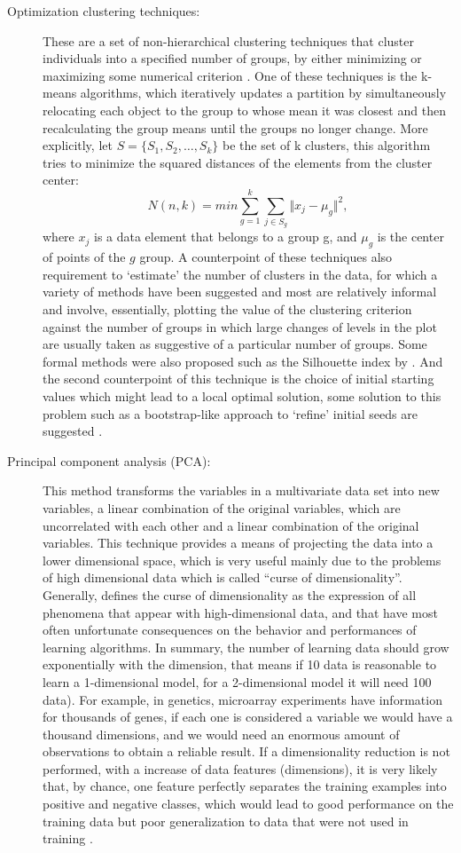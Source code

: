 \begin{description}
\item[Optimization clustering
techniques:]{
These are a set of non-hierarchical clustering techniques that cluster individuals into a specified number of groups, by either minimizing or maximizing some numerical criterion \cite{everitt2011hierarchical}.  One of these techniques is the k-means algorithms, which iteratively updates a partition by simultaneously relocating each object to the group to whose mean it was closest and then recalculating the group means until the groups no longer change.
More explicitly, let $S = \{S_1,S_2,\ldots,S_k\}$  be the set of k clusters, this algorithm tries to minimize the squared distances of the elements from the cluster center:
$$ N(n,k) = min\sum_{g = 1}^{k}\sum_{j \in S_g}\Vert x_j - \mu_g\Vert^2,$$
where $x_j$ is a data element that belongs to a group g, and $\mu_g$ is the center of points of the $g$ group. A counterpoint of these techniques also requirement to ‘estimate’ the number of clusters in the data, for which a variety of methods
have been suggested and  most are
relatively informal and involve, essentially, plotting the value of the clustering
criterion against the number of groups in which large changes of levels in the plot are
usually taken as suggestive of a particular number of groups.
Some formal methods were also proposed such as the Silhouette index by .
And the second counterpoint of this technique is the choice of initial starting values which might lead to a local optimal solution, some solution to this problem such as a  bootstrap-like approach to ‘refine’ initial seeds are suggested \cite{steinley2003local}.
}
\item[Principal component analysis (PCA):]{
This method transforms the variables in a multivariate data set into new variables, a linear combination of the original variables, which are uncorrelated with each other and a linear combination of the original variables. This technique provides a means of
projecting the data into a lower dimensional space, which is very useful  mainly due to the problems of high dimensional data which is called ``curse of dimensionality''.
Generally,  defines the curse of dimensionality as the expression of all phenomena that appear with high-dimensional data, and that have most often unfortunate consequences on the behavior and performances of learning algorithms. In summary, the number of learning data should grow exponentially with
the dimension, that means if 10 data  is reasonable to learn a 1-dimensional model, for a 2-dimensional model it will need 100 data). For example, in genetics, microarray experiments have information for thousands of genes, if each one is considered a variable we would have a thousand dimensions,
and we would need an enormous amount of observations to obtain a reliable result. If a dimensionality reduction is not performed, with a increase of data features (dimensions), it is very likely that, by chance, one feature perfectly separates the training examples into positive and negative classes, which would lead
to good performance on the training data but poor generalization to data that were not used in training \cite{libbrecht2015machine}.
}
\end{description}
